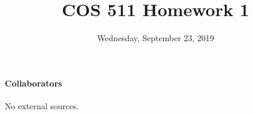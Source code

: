 \documentclass[12pt]{pset}
\title{COS 511 Homework 1}
\date{Wednesday, September 23, 2019}
\begin{document}
\maketitle

\pp\td

\closepp
\paragraph{Collaborators}
No external sources.
\td

% 

\end{document}
